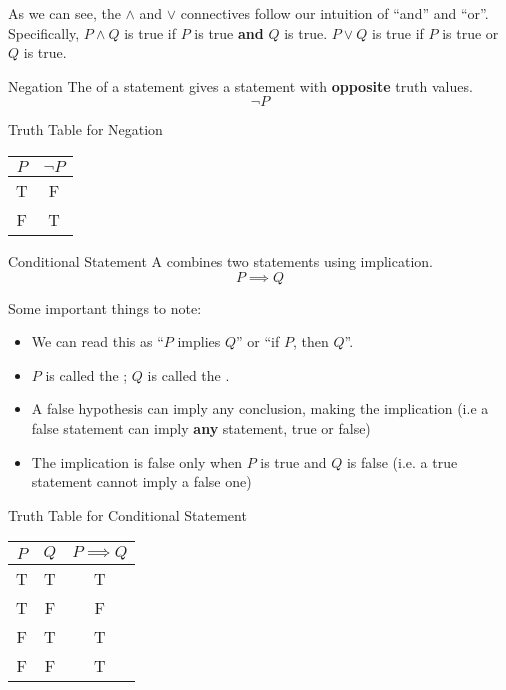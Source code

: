 \documentclass[letterpaper,12pt]{report}
\begin{document}
As we can see, the $\land$ and $\lor$ connectives follow our intuition of ``and'' and ``or''. Specifically, $P \land Q$ is true if $P$ is true \textbf{and} $Q$ is true. $P \lor Q$ is true if $P$ is true or $Q$ is true.

\begin{dfnbox}{Negation}{}
    The  of a statement gives a statement with \textbf{opposite} truth values.
	\tcblower
	\[\neg P\]
\end{dfnbox}



\begin{exbox}{Truth Table for Negation}{}
	\begin{center}
		\begin{tabular}{c||c}
			$P$ & $\neg P$ \\ \hline
			T & F \\ \hline
			F & T \\
		\end{tabular}
	\end{center}
\end{exbox}

\begin{dfnbox}{Conditional Statement}{}
    A  combines two statements using implication.
	\tcblower
	\[P \implies Q\]
\end{dfnbox}

Some important things to note:
\begin{itemize}
	\item We can read this as ``$P$ implies $Q$'' or ``if $P$, then $Q$''.
	\item $P$ is called the ; $Q$ is called the .
	\item A false hypothesis can imply any conclusion, making the implication  (i.e a false statement can imply \textbf{any} statement, true or false)
	\item The implication is false only when $P$ is true and $Q$ is false (i.e. a true statement cannot imply a false one)
\end{itemize}

\begin{exbox}{Truth Table for Conditional Statement}{}
	\begin{center}
		\begin{tabular}{ c | c || c}
			$P$ & $Q$ & $P \implies Q$ \\ \hline
			T & T & T \\ \hline
			T & F & F \\ \hline
			F & T & T \\ \hline
			F & F & T \\
		\end{tabular}
	\end{center}
\end{exbox}
\end{document}
